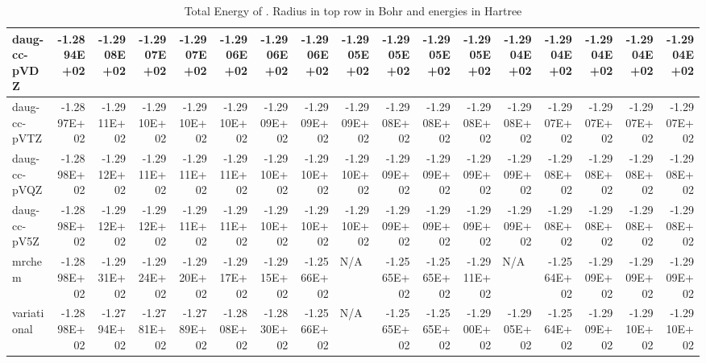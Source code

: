 \documentclass[../master_thesis.tex]{subfiles}
\begin{document}
\begin{sidewaystable}[h]
{{\begin{tabular}{|l|r|r|r|r|r|r|r|r|r|r|r|r|r|r|r|r|}
    daug-cc-pVDZ & -1.2894E+02 & -1.2908E+02 & -1.2907E+02 & -1.2907E+02 & -1.2906E+02 & -1.2906E+02 & -1.2906E+02 & -1.2905E+02 & -1.2905E+02 & -1.2905E+02 & -1.2905E+02 & -1.2904E+02 & -1.2904E+02 & -1.2904E+02 & -1.2904E+02 & -1.2904E+02 \\ \hline
    daug-cc-pVTZ & -1.2897E+02 & -1.2911E+02 & -1.2910E+02 & -1.2910E+02 & -1.2910E+02 & -1.2909E+02 & -1.2909E+02 & -1.2909E+02 & -1.2908E+02 & -1.2908E+02 & -1.2908E+02 & -1.2908E+02 & -1.2907E+02 & -1.2907E+02 & -1.2907E+02 & -1.2907E+02 \\ \hline
    daug-cc-pVQZ & -1.2898E+02 & -1.2912E+02 & -1.2911E+02 & -1.2911E+02 & -1.2911E+02 & -1.2910E+02 & -1.2910E+02 & -1.2910E+02 & -1.2909E+02 & -1.2909E+02 & -1.2909E+02 & -1.2909E+02 & -1.2908E+02 & -1.2908E+02 & -1.2908E+02 & -1.2908E+02 \\ \hline
    daug-cc-pV5Z & -1.2898E+02 & -1.2912E+02 & -1.2912E+02 & -1.2911E+02 & -1.2911E+02 & -1.2910E+02 & -1.2910E+02 & -1.2910E+02 & -1.2909E+02 & -1.2909E+02 & -1.2909E+02 & -1.2909E+02 & -1.2908E+02 & -1.2908E+02 & -1.2908E+02 & -1.2908E+02 \\ \hline
    mrchem & -1.2898E+02 & -1.2931E+02 & -1.2924E+02 & -1.2920E+02 & -1.2917E+02 & -1.2915E+02 & -1.2566E+02 & \multicolumn{1}{l|}{N/A} & -1.2565E+02 & -1.2565E+02 & -1.2911E+02 & \multicolumn{1}{l|}{N/A} & -1.2564E+02 & -1.2909E+02 & -1.2909E+02 & -1.2909E+02 \\ \hline
    variational & -1.2898E+02 & -1.2794E+02 & -1.2781E+02 & -1.2789E+02 & -1.2808E+02 & -1.2830E+02 & -1.2566E+02 & \multicolumn{1}{l|}{N/A} & -1.2565E+02 & -1.2565E+02 & -1.2900E+02 & -1.2905E+02 & -1.2564E+02 & -1.2909E+02 & -1.2910E+02 & -1.2910E+02 \\ \hline
  \end{tabular}}}{\caption{Total Energy of .  Radius in top row in Bohr and energies in Hartree}
  \label{tab:rawnopdata}}


\ttabbox{

}
\end{sidewaystable}
\end{document}

